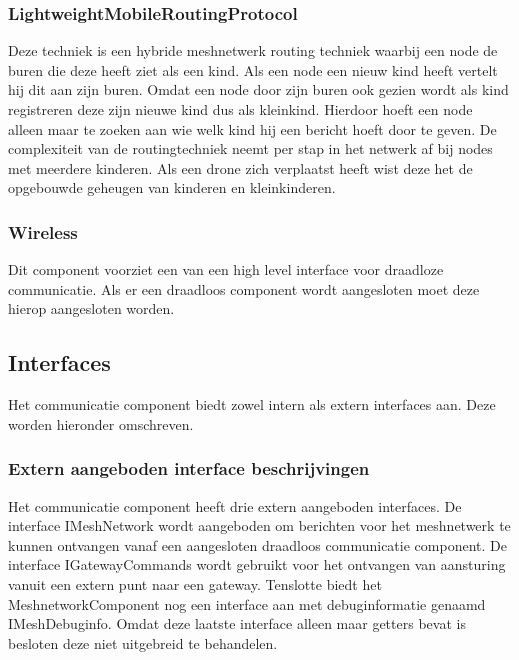 \documentclass[a4paper, 11pt, oneside]{report}
\begin{document}
\subsubsection{LightweightMobileRoutingProtocol}
\label{architectural:subcomponenten:LightweightMobileRoutingProtocol}
Deze techniek is een hybride meshnetwerk routing techniek waarbij een node de buren die deze heeft ziet als een kind.
Als een node een nieuw kind heeft vertelt hij dit aan zijn buren.
Omdat een node door zijn buren ook gezien wordt als kind registreren deze zijn nieuwe kind dus als kleinkind.
Hierdoor hoeft een node alleen maar te zoeken aan wie welk kind hij een bericht hoeft door te geven. 
De complexiteit van de routingtechniek neemt per stap in het netwerk af bij nodes met meerdere kinderen.
Als een drone zich verplaatst heeft wist deze het de opgebouwde geheugen van kinderen en kleinkinderen. 

\subsubsection{Wireless}
\label{architectural:subcomponenten:Wireless}
Dit component voorziet een  van een high level interface voor draadloze communicatie.
Als er een draadloos component wordt aangesloten moet deze hierop aangesloten worden. 
\subsection{Interfaces}
\label{DetailedDesign:CommunicatieComponentDiagram:interface}
Het communicatie component biedt zowel intern als extern interfaces aan. Deze worden hieronder omschreven.

\subsubsection{Extern aangeboden interface beschrijvingen}
\label{DetailedDesign:CommunicatieComponentDiagram:interface:extern}
Het communicatie component heeft drie extern aangeboden interfaces. De interface IMeshNetwork wordt aangeboden om berichten voor het meshnetwerk te kunnen ontvangen vanaf een aangesloten draadloos communicatie component. De interface IGatewayCommands wordt gebruikt voor het ontvangen van aansturing vanuit een extern punt naar een gateway. Tenslotte biedt het MeshnetworkComponent nog een interface aan met debuginformatie genaamd IMeshDebuginfo. Omdat deze laatste interface alleen maar getters bevat is besloten deze niet uitgebreid te behandelen.
\end{document}

